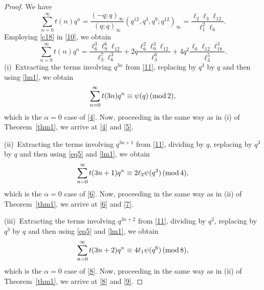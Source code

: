 \documentclass[12pt]{article}
\renewcommand{\(}{\left\(}
\renewcommand{\)}{\right\)}
\renewcommand{\[}{\left[}
\renewcommand{\]}{\right]}
\renewcommand{\pmod}[1]{\,(\textup{mod}\,#1)}
\numberwithin{equation}{section}
\theoremstyle{plain}
\begin{document}
\begin{proof}
We have
\begin{equation}\label{10}
\sum_{n=0}^{\infty}t(n)q^n=\dfrac{(-q;q)_\infty}{(q;q)_\infty}(q^{12},q^3,q^9;q^{12})_\infty=\dfrac{\ell_2\ell_3\ell_{12}}{\ell_1^2\ell_6}.
\end{equation}Employing \eqref{c18} in \eqref{10}, we obtain
\begin{equation}\label{11}
\sum_{n=0}^{\infty}t(n)q^n=\dfrac{\ell_6^3\ell_9^6\ell_{12}}{\ell_3^7\ell_6^3}+2q\dfrac{\ell_6^2\ell_9^3\ell_{12}}{\ell_3^6}+4q^2\dfrac{\ell_6\ell_{12}\ell_{18}^3}{\ell_3^5}.
\end{equation}
(i)~Extracting the terms involving $q^{3n}$ from \eqref{11}, replacing by $q^3$ by $q$ and then using \eqref{lm1}, we obtain
$$ \sum_{n=0}^{\infty}t(3n)q^n\equiv\psi(q)\pmod{2},$$ which is the $\alpha=0$ case of \eqref{4}. Now, proceeding in the same way as in (i) of Theorem~\ref{thm1}, we arrive at \eqref{4} and \eqref{5}.

(ii)~Extracting the terms involving $q^{3n+1}$ from \eqref{11}, dividing by $q$, replacing by $q^3$ by $q$ and then using \eqref{eq5} and \eqref{lm1}, we obtain
$$\sum_{n=0}^{\infty}t(3n+1)q^n\equiv2\ell_2\psi(q^3)\pmod{4},$$ which is the $\alpha=0$ case of \eqref{6}. Now, proceeding in the same way as in (ii) of Theorem~\ref{thm1}, we arrive at \eqref{6} and \eqref{7}.

(iii)~Extracting the terms involving $q^{3n+2}$ from \eqref{11}, dividing by $q^2$, replacing by $q^3$ by $q$ and then using \eqref{eq5} and \eqref{lm1}, we obtain
$$\sum_{n=0}^{\infty}t(3n+2)q^n\equiv4\ell_1\psi(q^6)\pmod{8},$$ which is the $\alpha=0$ case of \eqref{8}. Now, proceeding in the same way as in (ii) of Theorem~\ref{thm1}, we arrive at \eqref{8} and \eqref{9}.
\end{proof}
\end{document}
